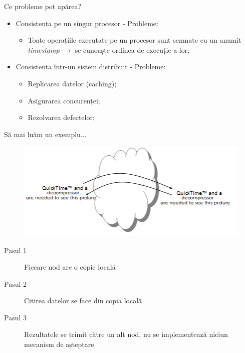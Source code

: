 \documentclass[9pt]{beamer}
\begin{document}
\begin{frame}{Ce probleme pot apărea?}
\begin{itemize}
    \item \Large{Consistența pe un singur procesor - Probleme:}
    \begin{itemize}
		\vskip5pt
		\item Toate operațiile executate pe un procesor sunt semnate cu un anumit \textit{timestamp} $\rightarrow$
		se cunoaște ordinea de execuție a lor;
	\end{itemize}
	\vskip20pt
	\item \Large{Consistența într-un sistem distribuit - Probleme:}
    \begin{itemize}
		\vskip5pt
		\item Replicarea datelor (caching);
		\vskip5pt
		\item Asigurarea concurenței;
		\vskip5pt
		\item Rezolvarea defectelor;
	\end{itemize}
\end{itemize}
\end{frame}

\begin{frame}{Să mai luăm un exemplu...}
    \begin{figure}
        \includegraphics[scale=0.8]{figures/example1}
    \end{figure}
    \begin{description}
        \item[Pasul 1] Fiecare nod are o copie locală
        \vskip5pt
        \item[Pasul 2] Citirea datelor se face din copia locală
        \vskip5pt
        \item[Pasul 3] Rezultatele se trimit către un alt nod, nu se implementează niciun mecanism de așteptare
    \end{description}
\end{frame}
\end{document}
